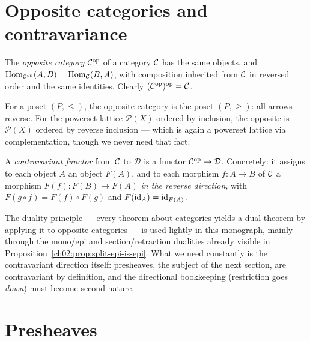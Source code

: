 \section{Opposite categories and contravariance}\label{ch02:sec:opposite}

\begin{definition}\label{ch02:def:opposite}
The \emph{opposite category} $\mathcal{C}^{\mathrm{op}}$ of a category $\mathcal{C}$ has
the same objects, and
$\mathrm{Hom}_{\mathcal{C}^{\mathrm{op}}}(A, B) = \mathrm{Hom}_{\mathcal{C}}(B, A)$, with composition
inherited from $\mathcal{C}$ in reversed order and the same identities. Clearly
$(\mathcal{C}^{\mathrm{op}})^{\mathrm{op}} = \mathcal{C}$.
\end{definition}

\begin{example}\label{ch02:ex:opposite-poset}
For a poset $(P, \le)$, the opposite category is the poset
$(P, \ge)$: all arrows reverse. For the powerset lattice
$\mathcal{P}(X)$ ordered by inclusion, the opposite is $\mathcal{P}(X)$
ordered by reverse inclusion --- which is again a powerset lattice via
complementation, though we never need that fact.
\end{example}

\begin{definition}\label{ch02:def:contravariant}
A \emph{contravariant functor} from $\mathcal{C}$ to $\mathcal{D}$ is a functor
$\mathcal{C}^{\mathrm{op}} \to \mathcal{D}$. Concretely: it assigns to each
object $A$ an object $F(A)$, and to each morphism $f : A \to B$ of $\mathcal{C}$
a morphism $F(f) : F(B) \to F(A)$ \emph{in the reverse direction}, with
$F(g \circ f) = F(f) \circ F(g)$ and $F(\mathrm{id}_A) = \mathrm{id}_{F(A)}$.
\end{definition}

The duality principle --- every theorem about categories yields a dual
theorem by applying it to opposite categories --- is used lightly in this
monograph, mainly through the mono/epi and section/retraction dualities
already visible in Proposition~\ref{ch02:prop:split-epi-is-epi}. What we
need constantly is the contravariant direction itself: presheaves, the
subject of the next section, are contravariant by definition, and the
directional bookkeeping (restriction goes \emph{down}) must become
second nature.

\section{Presheaves}\label{ch02:sec:presheaves}


